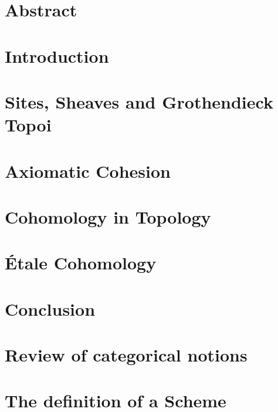 \documentclass[11pt]{memoir}
\theoremstyle{definition}
\begin{document}
  \chapter*{Abstract}
  
  
  \tableofcontents

  \chapter{Introduction}
  

  \chapter{Sites, Sheaves and Grothendieck Topoi}
  

  \chapter{Axiomatic Cohesion}
  

  \chapter{Cohomology in Topology}
  

  \chapter{\'Etale Cohomology}
  

  \chapter{Conclusion}
  

  \appendix
  \chapter{Review of categorical notions}
  
  \chapter{The definition of a Scheme}
  

  
  
\end{document}
